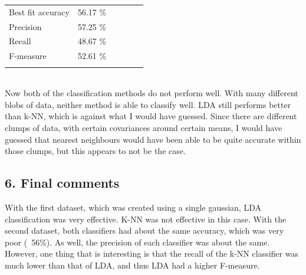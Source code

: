 \documentclass[11pt]{article}
\begin{document}
\begin{tabular}{llllll}
Best fit accuracy & 56.17 \% &  &  &  &  \\
Precision         & 57.25 \% &  &  &  &  \\
Recall            & 48.67 \% &  &  &  &  \\
F-measure         & 52.61 \% &  &  &  &  \\
                  &          &  &  &  &  \\
\end{tabular}\\
Now both of the classification methods do not perform well. With many different blobs of data, neither method is able to classify well. LDA still performs better than k-NN, which is against what I would have guessed. Since there are different clumps of data, with certain covariances around certain means, I would have guessed that nearest neighbours would have been able to be quite accurate within those clumps, but this appears to not be the case. 


\subsection*{6. Final comments}
With the first dataset, which was created using a single gaussian, LDA classification was very effective. K-NN was not effective in this case. With the second dataset, both classifiers had about the same accuracy, which was very poor (~56\%). As well, the precision of each classifier was about the same. However, one thing that is interesting is that the recall of the k-NN classifier was much lower than that of LDA, and thus LDA had a higher F-measure.
\end{document}
